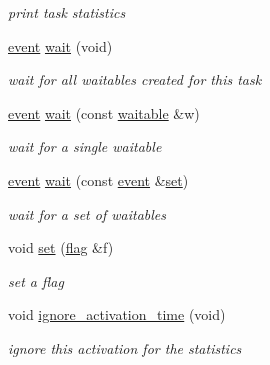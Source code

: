 \begin{DoxyCompactItemize}
\begin{DoxyCompactList}\small\item\em print task statistics \end{DoxyCompactList}\item 
\hyperlink{classrtos_1_1event}{event} \hyperlink{classrtos_1_1task__base_a2590ba76480cecaff66282516fbeb1bb}{wait} (void)
\begin{DoxyCompactList}\small\item\em wait for all waitables created for this task \end{DoxyCompactList}\item 
\hyperlink{classrtos_1_1event}{event} \hyperlink{classrtos_1_1task__base_a52035722f108687680966b87dd60bfe1}{wait} (const \hyperlink{classrtos_1_1waitable}{waitable} \&w)
\begin{DoxyCompactList}\small\item\em wait for a single waitable \end{DoxyCompactList}\item 
\hyperlink{classrtos_1_1event}{event} \hyperlink{classrtos_1_1task__base_a6acecfe733161a6258d39ed7a49275d0}{wait} (const \hyperlink{classrtos_1_1event}{event} \&\hyperlink{classrtos_1_1task__base_a1b3cb75ba2ef779cffc76b6076ecac39}{set})
\begin{DoxyCompactList}\small\item\em wait for a set of waitables \end{DoxyCompactList}\item 
void \hyperlink{classrtos_1_1task__base_a1b3cb75ba2ef779cffc76b6076ecac39}{set} (\hyperlink{classrtos_1_1flag}{flag} \&f)\hypertarget{classrtos_1_1task__base_a1b3cb75ba2ef779cffc76b6076ecac39}{}\label{classrtos_1_1task__base_a1b3cb75ba2ef779cffc76b6076ecac39}

\begin{DoxyCompactList}\small\item\em set a flag \end{DoxyCompactList}\item 
void \hyperlink{classrtos_1_1task__base_a31d2bfe971b2c526125d5a670d8465f4}{ignore\+\_\+activation\+\_\+time} (void)
\begin{DoxyCompactList}\small\item\em ignore this activation for the statistics \end{DoxyCompactList}\end{DoxyCompactItemize}
